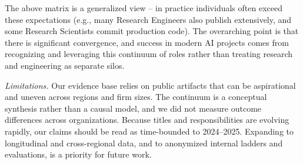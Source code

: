 \documentclass[pdflatex,sn-mathphys-num]{sn-jnl}%
\theoremstyle{thmstyleone}%
\theoremstyle{thmstyletwo}%
\theoremstyle{thmstylethree}%
\begin{document}
The above matrix is a generalized view – in practice individuals often exceed these expectations (e.g., many Research Engineers also publish extensively, and some Research Scientists commit production code). The overarching point is that there is significant convergence, and success in modern AI projects comes from recognizing and leveraging this continuum of roles rather than treating research and engineering as separate silos. 

\textit{Limitations.} Our evidence base relies on public artifacts that can be aspirational and uneven across regions and firm sizes. The continuum is a conceptual synthesis rather than a causal model, and we did not measure outcome differences across organizations. Because titles and responsibilities are evolving rapidly, our claims should be read as time-bounded to 2024–2025. Expanding to longitudinal and cross-regional data, and to anonymized internal ladders and evaluations, is a priority for future work.

\end{document}
